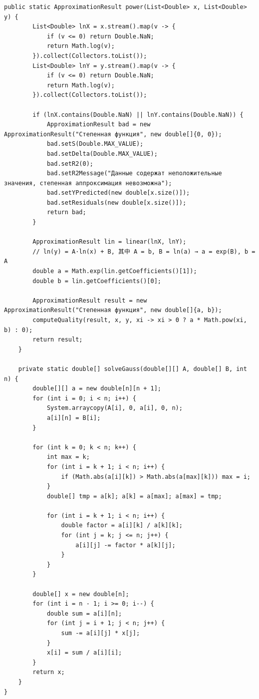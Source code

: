 \begin{lstlisting}[style=javaStyle, label=code:lsm]
    public static ApproximationResult power(List<Double> x, List<Double> y) {
        List<Double> lnX = x.stream().map(v -> {
            if (v <= 0) return Double.NaN;
            return Math.log(v);
        }).collect(Collectors.toList());
        List<Double> lnY = y.stream().map(v -> {
            if (v <= 0) return Double.NaN;
            return Math.log(v);
        }).collect(Collectors.toList());

        if (lnX.contains(Double.NaN) || lnY.contains(Double.NaN)) {
            ApproximationResult bad = new ApproximationResult("Степенная функция", new double[]{0, 0});
            bad.setS(Double.MAX_VALUE);
            bad.setDelta(Double.MAX_VALUE);
            bad.setR2(0);
            bad.setR2Message("Данные содержат неположительные значения, степенная аппроксимация невозможна");
            bad.setYPredicted(new double[x.size()]);
            bad.setResiduals(new double[x.size()]);
            return bad;
        }

        ApproximationResult lin = linear(lnX, lnY);
        // ln(y) = A·ln(x) + B, 其中 A = b, B = ln(a) → a = exp(B), b = A
        double a = Math.exp(lin.getCoefficients()[1]);
        double b = lin.getCoefficients()[0];

        ApproximationResult result = new ApproximationResult("Степенная функция", new double[]{a, b});
        computeQuality(result, x, y, xi -> xi > 0 ? a * Math.pow(xi, b) : 0);
        return result;
    }

    private static double[] solveGauss(double[][] A, double[] B, int n) {
        double[][] a = new double[n][n + 1];
        for (int i = 0; i < n; i++) {
            System.arraycopy(A[i], 0, a[i], 0, n);
            a[i][n] = B[i];
        }

        for (int k = 0; k < n; k++) {
            int max = k;
            for (int i = k + 1; i < n; i++) {
                if (Math.abs(a[i][k]) > Math.abs(a[max][k])) max = i;
            }
            double[] tmp = a[k]; a[k] = a[max]; a[max] = tmp;

            for (int i = k + 1; i < n; i++) {
                double factor = a[i][k] / a[k][k];
                for (int j = k; j <= n; j++) {
                    a[i][j] -= factor * a[k][j];
                }
            }
        }

        double[] x = new double[n];
        for (int i = n - 1; i >= 0; i--) {
            double sum = a[i][n];
            for (int j = i + 1; j < n; j++) {
                sum -= a[i][j] * x[j];
            }
            x[i] = sum / a[i][i];
        }
        return x;
    }
}
\end{lstlisting}

